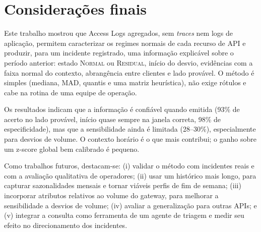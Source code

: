 \documentclass[sigconf,nonacm]{acmart}
\newcommand{\Normal}{\textsc{Normal}\xspace}
\newcommand{\Residual}{\textsc{Residual}\xspace}
\begin{document}
\section{Considerações finais}\label{sec:conclusao}

Este trabalho mostrou que Access Logs agregados, sem \emph{traces} nem logs de aplicação, permitem caracterizar os regimes normais de cada recurso de API e produzir, para um incidente registrado, uma informação explicável sobre o período anterior: estado \Normal ou \Residual, início do desvio, evidências com a faixa normal do contexto, abrangência entre clientes e lado provável. O método é simples (mediana, MAD, quantis e uma matriz heurística), não exige rótulos e cabe na rotina de uma equipe de operação.

Os resultados indicam que a informação é confiável quando emitida (93\% de acerto no lado provável, início quase sempre na janela correta, 98\% de especificidade), mas que a sensibilidade ainda é limitada (28--30\%), especialmente para desvios de volume. O contexto horário é o que mais contribui; o ganho sobre um z-score global bem calibrado é pequeno.

Como trabalhos futuros, destacam-se: (i) validar o método com incidentes reais e com a avaliação qualitativa de operadores; (ii) usar um histórico mais longo, para capturar sazonalidades mensais e tornar viáveis perfis de fim de semana; (iii) incorporar atributos relativos ao volume do gateway, para melhorar a sensibilidade a desvios de volume; (iv) avaliar a generalização para outras APIs; e (v) integrar a consulta como ferramenta de um agente de triagem e medir seu efeito no direcionamento dos incidentes.



\end{document}

